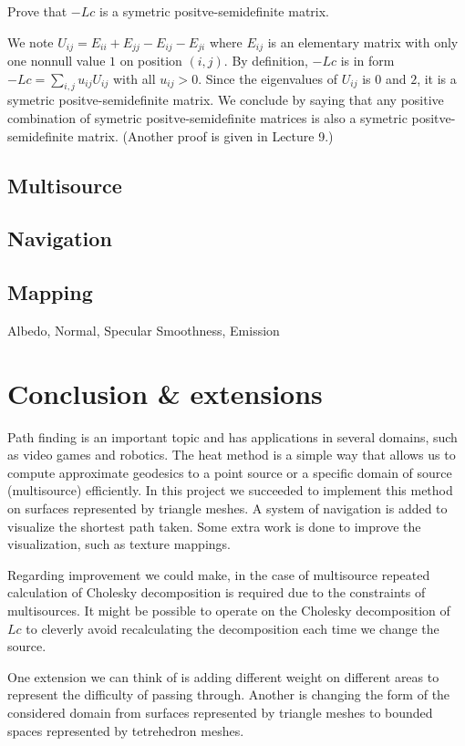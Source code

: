 \documentclass[a4paper,12pt,twoside]{article}
\begin{document}
Prove that $-Lc$ is a symetric positve-semidefinite matrix.

We note $U_{ij}=E_{ii}+E_{jj}-E_{ij}-E_{ji}$ where $E_{ij}$ is an elementary matrix with only one nonnull value $1$ on position $(i,j)$. By definition, $-Lc$ is in form  $-Lc=\sum_{i,j}u_{ij}U_{ij}$ with all $u_{ij}>0$. Since the eigenvalues of $U_{ij}$ is $0$ and $2$, it is a symetric positve-semidefinite matrix. We conclude by saying that any positive combination of symetric positve-semidefinite matrices is also a symetric positve-semidefinite matrix. (Another proof is given in Lecture 9.)\\

\subsection{Multisource}

\subsection{Navigation}

\subsection{Mapping}
Albedo, Normal, Specular Smoothness, Emission


\section{Conclusion \& extensions}
Path finding is an important topic and has applications in several domains, such as video games and robotics. The heat method is a simple way that allows us to compute approximate geodesics to a point source or a specific domain of source (multisource) efficiently. In this project we succeeded to implement this method on surfaces represented by triangle meshes. A system of navigation is added to visualize the shortest path taken. Some extra work is done to improve the visualization, such as texture mappings.

Regarding improvement we could make, in the case of multisource repeated calculation of Cholesky decomposition is required due to the constraints of multisources. It might be possible to operate on the Cholesky decomposition of $Lc$ to cleverly avoid recalculating the decomposition each time we change the source.

One extension we can think of is adding different weight on different areas to represent the difficulty of passing through. Another is changing the form of the considered domain from surfaces represented by triangle meshes to bounded spaces represented by tetrehedron meshes.
\end{document}
